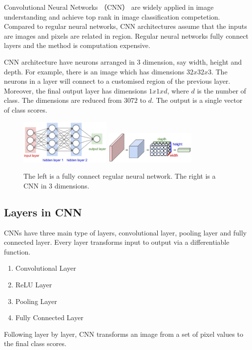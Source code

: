 Convolutional Neural Networks\citep{lecun1998gradient} （CNN） are widely applied in image understanding and achieve top rank in image classification competetion\citep{krizhevsky2012imagenet}. Compared to regular neural networks, CNN architectures assume that the inputs are images and pixels are related in region. Regular neural networks fully connect layers and the method is computation expensive.

CNN architecture have neurons arranged in 3 dimension, say width, height and depth. For example, there is an image which has dimensions $32x32x3$. The neurons in a layer will connect to a customised region of the previous layer. Moreover, the final output layer has dimensions $1x1xd$, where $d$ is the number of class. The dimensions are reduced from $3072$ to $d$. The output is a single vector of class scores.

\graphicspath{ {./Figures/} }
\begin{figure}[!htb]
\centering
\includegraphics[width=0.4\textwidth]{neural_net2.jpeg}
\includegraphics[width=0.4\textwidth]{cnn.jpeg}
\caption{\label{fig:compareCNNandFC}The left is a fully connect regular neural network. The right is a CNN in 3 dimensions.}
\end{figure}

\subsection{Layers in CNN}
CNNs have three main type of layers, convolutional layer, pooling layer and fully connected layer. Every layer transforms input to output via a differentiable function. 
\begin{enumerate}
  \item Convolutional Layer
  \item ReLU Layer
  \item Pooling Layer
  \item Fully Connected Layer
\end{enumerate}
Following layer by layer, CNN transforms an image from a set of pixel values to the final class scores.

